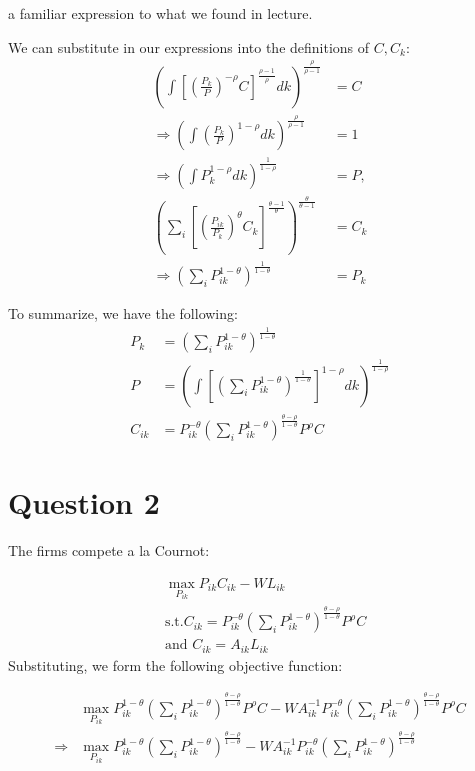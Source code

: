 \documentclass[11pt]{article} %
\begin{document}
a familiar expression to what we found in lecture.

We can substitute in our expressions into the definitions of $C,C_k$:
\begin{align*}
\left( \int \left[ \left( \frac{P_k}{P} \right)^{-\rho}C  \right]^{\frac{\rho - 1}{\rho}} dk \right)^{\frac{\rho}{\rho - 1}} &= C\\
\Rightarrow \left( \int  \left( \frac{P_k}{P} \right)^{1-\rho} dk \right)^{\frac{\rho}{\rho - 1}}  &= 1\\
\Rightarrow \left( \int  P_k^{1-\rho} dk \right)^{\frac{1}{ 1-\rho}}  &= P, \\
\left( \sum_i \left[ \left( \frac{P_{ik}}{P_k} \right)^{\theta} C_k \right]^{\frac{\theta - 1}{\theta}}\right)^{\frac{\theta}{\theta - 1}} &= C_k \\
\Rightarrow \left( \sum_i P_{ik}^{1-\theta} \right)^{\frac{1}{1-\theta}} &= P_k
\end{align*}

To summarize, we have the following:
\begin{align}
P_k &=  \left( \sum_i P_{ik}^{1-\theta} \right)^{\frac{1}{1-\theta}}\\
P &=  \left( \int  \left[  \left( \sum_i P_{ik}^{1-\theta} \right)^{\frac{1}{1-\theta}} \right]^{1-\rho} dk \right)^{\frac{1}{1-\rho}} \\
C_{ik} &= P_{ik}^{-\theta}\left( \sum_i P_{ik}^{1-\theta }\right)^{\frac{ \theta-\rho}{1-\theta }} P^{\rho} C
\end{align}

\section{Question 2}
The firms compete a la Cournot:

\begin{align*}
&\max_{P_{ik}} P_{ik}C_{ik} - WL_{ik}\\
&\text{s.t.} C_{ik} = P_{ik}^{-\theta}\left( \sum_i P_{ik}^{1-\theta }\right)^{\frac{ \theta-\rho}{1-\theta }} P^{\rho} C\\
&\text{and } C_{ik} = A_{ik}L_{ik}
\end{align*}
Substituting, we form the following objective function:

\begin{align*}
&\max_{P_{ik}}P_{ik}^{1-\theta}\left( \sum_i P_{ik}^{1-\theta }\right)^{\frac{ \theta-\rho}{1-\theta}} P^{\rho} C - WA_{ik}^{-1}P_{ik}^{-\theta}\left( \sum_i P_{ik}^{1-\theta }\right)^{\frac{ \theta-\rho}{1-\theta}} P^{\rho} C \\
\Rightarrow &\max_{P_{ik}}P_{ik}^{1-\theta}\left( \sum_i P_{ik}^{1-\theta}\right)^{\frac{ \theta-\rho}{1-\theta}}  - WA_{ik}^{-1}P_{ik}^{-\theta}\left( \sum_i P_{ik}^{1-\theta}\right)^{\frac{ \theta-\rho}{1-\theta }} 
\end{align*}
\end{document}
